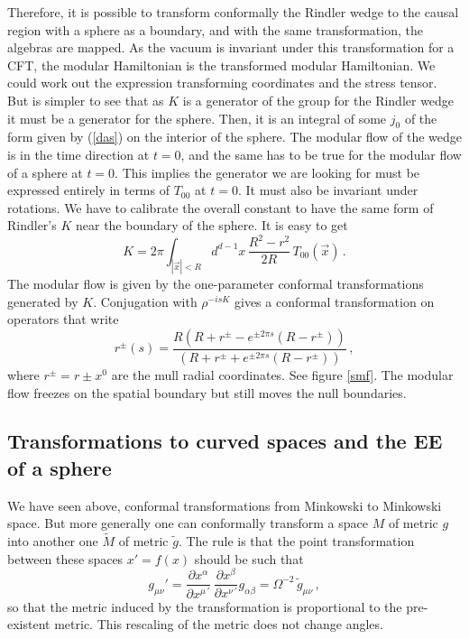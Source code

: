 \documentclass[12pt]{article}
\numberwithin{equation}{section}
\newcommand{\be}{\begin{equation}}
\newcommand{\ee}{\end{equation}}
\begin{document}
Therefore, it is possible to transform conformally the Rindler wedge to the causal region with a sphere as a boundary, and with the same transformation, the algebras are mapped. As the vacuum is invariant under this transformation for a CFT, the modular Hamiltonian is the transformed modular Hamiltonian. We could work out the expression transforming coordinates and the stress tensor. But is simpler to see that as $K$ is a generator of the group for the Rindler wedge it must be a generator for the sphere. Then, it is an integral of some $j_0$ of the form given by (\ref{das}) on the interior of the sphere. The modular flow of the wedge is in the time direction at $t=0$, and the same has to be true for the modular flow of a sphere at $t=0$. This implies the generator we are looking for must be expressed entirely in terms of $T_{00}$ at $t=0$. It must also be invariant under rotations. We have to calibrate the overall constant to have the same form of Rindler's $K$ near the boundary of the sphere. It is easy to  get
\be
K=2\pi \int_{|\vec{x}|<R} d^{d-1}x\, \frac{R^2-r^2}{2R}\, T_{00}(\vec{x})\,.\label{modesf}
\ee    
The modular flow is given by the one-parameter conformal transformations generated by $K$. Conjugation with $\rho^{-i s K}$ gives a conformal transformation on operators that write
\be
r^{\pm}(s)=\frac{R(R+r^{\pm}-e^{\pm 2\pi s}(R-r^{\pm}))}{(R+r^{\pm}+e^{\pm 2\pi s}(R-r^{\pm}))}\,,
\ee
where $r^{\pm}=r\pm x^0$ are the mull radial coordinates. See figure \ref{smf}.
The modular flow freezes on the spatial boundary but still moves the null boundaries. 



\subsection{Transformations to curved spaces and the EE of a sphere} 
\label{tow}

We have seen above, conformal transformations from Minkowski to Minkowski space. But more generally one can conformally transform a space $M$ of metric $g$ into another one $\tilde{M}$ of metric $\tilde{g}$. The rule is that the point transformation between these spaces $x'=f(x)$ should be such that
\be
g_{\mu\nu}'=\frac{\partial x^\alpha}{\partial x^{\mu\, '} }\, \frac{\partial x^\beta}{\partial x^{\nu\,'}} g_{\alpha\beta} =\Omega^{-2} \, \tilde{g}_{\mu\nu}\,, 
\ee
so that the metric induced by the transformation is proportional to the pre-existent metric. This rescaling of the metric does not change angles. 
\end{document}
